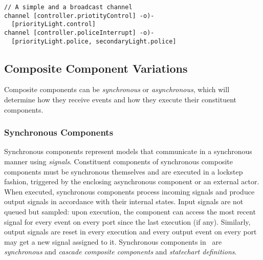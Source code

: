 
\begin{lstlisting}
// A simple and a broadcast channel
channel [controller.priotityControl] -o)-
  [priorityLight.control]
channel [controller.policeInterrupt] -o)-
  [priorityLight.police, secondaryLight.police]
\end{lstlisting}

\subsection{Composite Component Variations}
\label{sec:composite}

Composite components can be \emph{synchronous} or \emph{asynchronous}, which will determine how they receive events and how they execute their constituent components.

\subsubsection{Synchronous Components}
Synchronous components represent models that communicate
in a synchronous manner using \emph{signals}. Constituent components of synchronous composite components must be synchronous themselves and are executed in a lockstep fashion, triggered by the enclosing asynchronous component or an external actor.
When executed, synchronous components process incoming signals
and produce output signals in accordance with their internal states. Input signals are not queued but sampled: upon execution, the component can access the most recent signal for every event on every port since the last execution (if any). Similarly, output signals are reset in every execution and every output event on every port may get a new signal assigned to it.
Synchronous components in \gamma\ are \emph{synchronous} and \emph{cascade composite components} and \emph{statechart definitions}.%

